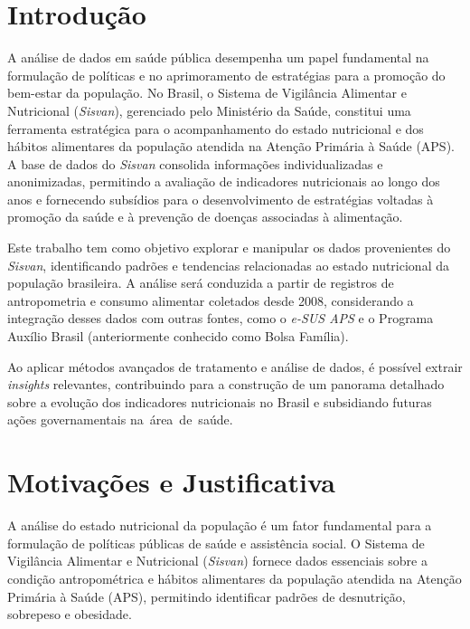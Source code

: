 \documentclass[
	article,			%
	11pt,				%
	oneside,			%
	a4paper,			%
	english,			%
	brazil,				%
	sumario=tradicional
	]{abntex2}
\begin{document}
\textual


\section{Introdução}
\textit{}
A análise de dados em saúde pública desempenha um papel fundamental na formulação de políticas e no aprimoramento de estratégias para a promoção do bem-estar da população. No Brasil, o Sistema de Vigilância Alimentar e Nutricional (\textit{Sisvan}), gerenciado pelo Ministério da Saúde, constitui uma ferramenta estratégica para o acompanhamento do estado nutricional e dos hábitos alimentares da população atendida na Atenção Primária à Saúde (APS). A base de dados do \textit{Sisvan} consolida informações individualizadas e anonimizadas, permitindo a avaliação de indicadores nutricionais ao longo dos anos e fornecendo subsídios para o desenvolvimento de estratégias voltadas à promoção da saúde e à prevenção de doenças associadas à alimentação.

Este trabalho tem como objetivo explorar e manipular os dados provenientes do \textit{Sisvan}, identificando padrões e tendencias relacionadas ao estado nutricional da população brasileira. A análise será conduzida a partir de registros de antropometria e consumo alimentar coletados desde 2008, considerando a integração desses dados com outras fontes, como o \textit{e-SUS APS}  e o Programa Auxílio Brasil (anteriormente conhecido como Bolsa Família).

Ao aplicar métodos avançados de tratamento e análise de dados, é possível extrair \textit{insights} relevantes, contribuindo para a construção de um panorama detalhado sobre a evolução dos indicadores nutricionais no Brasil e subsidiando futuras ações governamentais na área de saúde.

\section{Motivações e Justificativa}
\textit{}
A análise do estado nutricional da população é um fator fundamental para a formulação de políticas públicas de saúde e assistência social. O Sistema de Vigilância Alimentar e Nutricional (\textit{Sisvan}) fornece dados essenciais sobre a condição antropométrica e hábitos alimentares da população atendida na Atenção Primária à Saúde (APS), permitindo identificar padrões de desnutrição, sobrepeso e obesidade.
\end{document}
